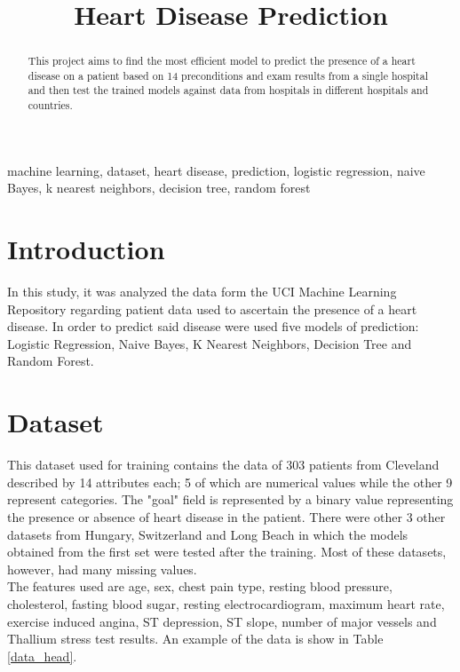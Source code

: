 \documentclass[conference]{IEEEtran}
\begin{document}
\title{Heart Disease Prediction}

\author{
}

\maketitle

\begin{abstract}
    This project aims to find the most efficient model to predict the presence of a heart disease on a patient based on 14 preconditions and exam results from a single hospital and then test the trained models against data from hospitals in different hospitals and countries.
\end{abstract}

\begin{IEEEkeywords}
    machine learning, dataset, heart disease, prediction, logistic regression, naive Bayes, k nearest neighbors, decision tree, random forest
\end{IEEEkeywords}

\section{Introduction}
In this study, it was analyzed the data form the UCI Machine Learning Repository\cite{mlr} regarding patient data used to ascertain the presence of a heart disease. In order to predict said disease were used five models of prediction: Logistic Regression, Naive Bayes, K Nearest Neighbors, Decision Tree and Random Forest.

\section{Dataset}
This dataset used for training contains the data of 303 patients from Cleveland\cite{va} described by 14 attributes each; 5 of which are numerical values while the other 9 represent categories. The "goal" field is represented by a binary value representing the presence or absence of heart disease in the patient. There were other 3 other datasets from Hungary\cite{hun}, Switzerland\cite{swz1,swz2} and Long Beach\cite{va} in which the models obtained from the first set were tested after the training. Most of these datasets, however, had many missing values.\\
The features used are age, sex, chest pain type, resting blood pressure, cholesterol, fasting blood sugar, resting electrocardiogram, maximum heart rate, exercise induced angina, ST depression, ST slope, number of major vessels and Thallium stress test results. An example of the data is show in Table \ref{data_head}.
\end{document}
